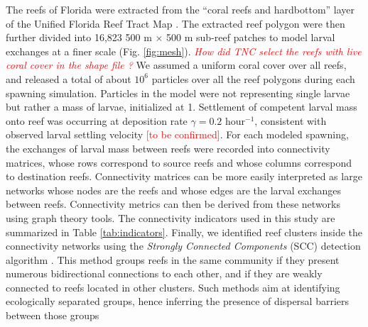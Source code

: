 \documentclass[preprint,12pt,authoryear]{elsarticle}
\newcommand{\emphc}[1]{\emph{\textcolor{red}{#1}}}
\begin{document}
The reefs of Florida were extracted from the “coral reefs and hardbottom” layer of the Unified Florida Reef Tract Map \citep{fwc2017unified}. The extracted reef polygon were then further divided into 16,823 500 m $\times$ 500 m sub-reef patches to model larval exchanges at a finer scale (Fig. \ref{fig:mesh}). \emphc{How did TNC select the reefs with live coral cover in the shape file ?} We assumed a uniform coral cover over all reefs, and released a total of about $10^6$ particles over all the reef polygons during each spawning simulation. Particles in the model were not representing single larvae but rather a mass of larvae, initialized at 1. Settlement of competent larval mass onto reef was occurring at deposition rate $\gamma = 0.2$ hour$^{-1}$, consistent with observed larval settling velocity \textcolor{red}{[to be confirmed]}. For each modeled spawning, the exchanges of larval mass between reefs were recorded into connectivity matrices, whose rows correspond to source reefs and whose columns correspond to destination reefs. Connectivity matrices can be more easily interpreted as large networks whose nodes are the reefs and whose edges are the larval exchanges between reefs. Connectivity metrics can then be derived from these networks using graph theory tools. The connectivity indicators used in this study are summarized in Table \ref{tab:indicators}. Finally, we identified reef clusters inside the connectivity networks using the \textit{Strongly Connected Components} (SCC) detection algorithm \citep{nuutila1994finding}. This method groups reefs in the same community if they present numerous bidirectional connections to each other, and if they are weakly connected to reefs located in other clusters. Such methods aim at identifying ecologically separated groups, hence inferring the presence of dispersal barriers between those groups \citep{thomas2014numerical,saint2023biophysical}
\end{document}
